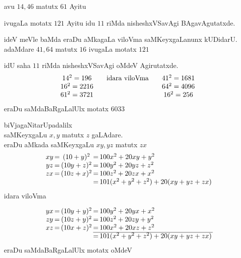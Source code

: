 avu $14,46$ matutx $61$ Ayitu
 
ivugaLa motatx $121$ Ayitu idu $11$ riMda nisheshxVSavAgi BAgavAgutatxde.

ideV meVle baMda eraDu aMkagaLa viloVma saMKeyxgaLanunx kUDidarU. adaMdare $41,64$ matutx $16$ ivugaLa motatx $121$

idU saha $11$ riMda nisheshxVSavAgi oMdeV Agirutatxde.
$$
\begin{array}[t]{c}
14^2=196\\
16^2=2216\\
61^2 = 3721
\end{array}
\hspace{0.5cm}
\text{idara viloVma}
\hspace{0.5cm}
\begin{array}[t]{c}
41^2 =1681\\
64^2 =4096\\
16^2 = 256
\end{array}
$$
eraDu saMdaBaRgaLalUlx motatx $6033$

biVjagaNitarUpadalilx \\
saMKeyxgaLu $x,y$ matutx $z$ gaLAdare.\\
eraDu aMkada saMKeyxgaLu $xy,yz$ matutx $zx$
$$
\begin{array}[c]{c@{\,}c@{\,}c@{\,}c@{\,}l@{\,}}
xy &=&(10+y)^2  &=& 100x^2+20xy+y^2\\
yz &=&(10y+z)^2 &=& 100y^2+20yz+z^2\\
zx &=&(10z+x)^2 &=& 100z^2+20zx+x^2\\
   & &          &=& 101(x^2+y^2+z^2)+20(xy+yz+zx)
\end{array}
$$
idara viloVma

$$
\begin{array}[c]{c@{\,}c@{\,}c@{\,}c@{\,}l@{\,}}
yx &=&(10y+y)^2  &=& 100y^2+20yx+x^2\\
zy &=&(10z+y)^2  &=& 100z^2+20zy+y^2\\
xz &=&(10x+z)^2  &=& 100x^2+20xz+z^2\\\cline{4-5}
   & &           &=& 101(x^2+y^2+z^2)+20(xy+yz+zx)
\end{array}
$$
eraDu saMdaBaRgaLalUlx motatx oMdeV
